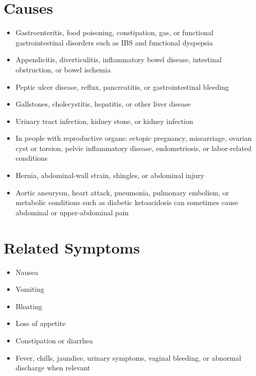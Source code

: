 \section*{Causes}
\begin{itemize}
 \item Gastroenteritis, food poisoning, constipation, gas, or functional gastrointestinal disorders such as IBS and functional dyspepsia
 \item Appendicitis, diverticulitis, inflammatory bowel disease, intestinal obstruction, or bowel ischemia
 \item Peptic ulcer disease, reflux, pancreatitis, or gastrointestinal bleeding
 \item Gallstones, cholecystitis, hepatitis, or other liver disease
 \item Urinary tract infection, kidney stone, or kidney infection
 \item In people with reproductive organs: ectopic pregnancy, miscarriage, ovarian cyst or torsion, pelvic inflammatory disease, endometriosis, or labor-related conditions
 \item Hernia, abdominal-wall strain, shingles, or abdominal injury
 \item Aortic aneurysm, heart attack, pneumonia, pulmonary embolism, or metabolic conditions such as diabetic ketoacidosis can sometimes cause abdominal or upper-abdominal pain
\end{itemize}

\section*{Related Symptoms}
\begin{itemize}
 \item Nausea
 \item Vomiting
 \item Bloating
 \item Loss of appetite
 \item Constipation or diarrhea
 \item Fever, chills, jaundice, urinary symptoms, vaginal bleeding, or abnormal discharge when relevant
\end{itemize}

